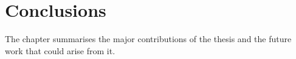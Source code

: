 
\chapter{Conclusions}


\begin{synopsis}

The chapter summarises the major contributions of the thesis and the future work that could arise from it.

\end{synopsis}